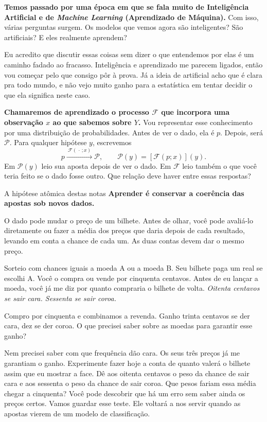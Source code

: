 \textbf{Temos passado por uma época em que se fala muito de Inteligência Artificial e de \emph{Machine Learning} (Aprendizado de Máquina).} Com isso, várias perguntas surgem. Os modelos que vemos agora são inteligentes? São artificiais? E eles realmente aprendem?

Eu acredito que discutir essas coisas sem dizer o que entendemos por elas é um caminho fadado ao fracasso. Inteligência e aprendizado me parecem ligados, então vou começar pelo que consigo pôr à prova. Já a ideia de artificial acho que é clara pra todo mundo, e não vejo muito ganho para a estatística em tentar decidir o que ela significa neste caso.

\textbf{Chamaremos de aprendizado o processo \(\mathcal F\) que incorpora uma observação \(x\) ao que sabemos sobre \(Y\).} Vou representar esse conhecimento por uma distribuição de probabilidades. Antes de ver o dado, ela é \(p\). Depois, será \(\mathcal P\). Para qualquer hipótese \(y\), escrevemos
\[
 p \xrightarrow{\ \mathcal F(\,\cdot\,;x)\ } \mathcal P,
 \qquad \mathcal P(y)=[\mathcal F(p;x)](y).
\]
Em $\mathcal P(y)$ leio sua aposta depois de ver o dado. Em $\mathcal F$ leio também o que você teria feito se o dado fosse outro. Que relação deve haver entre essas respostas?

\begin{quadro}{A hipótese atômica destas notas}
\textbf{Aprender é conservar a coerência das apostas sob novos dados.}

O dado pode mudar o preço de um bilhete. Antes de olhar, você pode avaliá-lo diretamente ou fazer a média dos preços que daria depois de cada resultado, levando em conta a chance de cada um. As duas contas devem dar o mesmo preço.
\end{quadro}

Sorteio com chances iguais a moeda A ou a moeda B. Seu bilhete paga um real se escolhi A. Você o compra ou vende por cinquenta centavos. Antes de eu lançar a moeda, você já me diz por quanto compraria o bilhete de volta. \emph{Oitenta centavos se sair cara. Sessenta se sair coroa.}

Compro por cinquenta e combinamos a revenda. Ganho trinta centavos se der cara, dez se der coroa. O que precisei saber sobre as moedas para garantir esse ganho?

Nem precisei saber com que frequência dão cara. Os seus três preços já me garantiam o ganho. Experimente fazer hoje a conta de quanto valerá o bilhete assim que eu mostrar a face. Dê aos oitenta centavos o peso da chance de sair cara e aos sessenta o peso da chance de sair coroa. Que pesos fariam essa média chegar a cinquenta? Você pode descobrir que há um erro sem saber ainda os preços certos. Vamos guardar esse teste. Ele voltará a nos servir quando as apostas vierem de um modelo de classificação.

